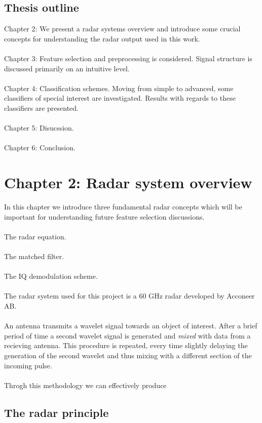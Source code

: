 \documentclass[a4paper, 12pt]{article}
\begin{document}
\subsection{Thesis outline}

Chapter 2: We present a radar systems overview and introduce some crucial concepts for understanding the radar output used in this work. 
\\ \\
Chapter 3: Feature selection and preprocessing is considered. Signal structure is discussed primarily on an intuitive level. 
\\ \\
Chapter 4: Classification schemes. Moving from simple to advanced, some classifiers of special interest are investigated. Results with regards to these classifiers are presented.
\\ \\
Chapter 5: Disucssion.
\\ \\
Chapter 6: Conclusion.

\section{Chapter 2: Radar system overview}

In this chapter we introduce three fundamental radar concepts which will be important for understanding future feature selection discussions. 
\\ \\
The radar equation.
\\ \\
The matched filter.
\\ \\
The IQ demodulation scheme. 
\\ \\
The radar system used for this project is a 60 GHz radar developed by Acconeer AB.
\\ \\
An antenna transmits a wavelet signal towards an object of interest. After a brief period of time a second wavelet signal is generated and \emph{mixed} with data from a recieving antenna. This procedure is repeated, every time slightly delaying the generation of the second wavelet and thus mixing with a different section of the incoming pulse. 
\\ \\
Throgh this methodology we can effectively produce

\subsection{The radar principle}
\end{document}

